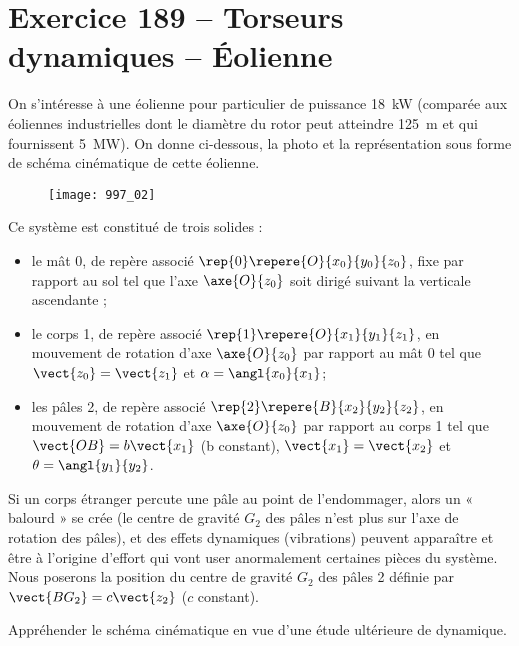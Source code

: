 \section*{Exercice 189 -- Torseurs dynamiques -- Éolienne}
\setcounter{exo}{0}

On s'intéresse à une éolienne pour particulier de puissance \SI{18}{kW} (comparée aux éoliennes
industrielles dont le diamètre du rotor peut atteindre \SI{125}{m} et qui fournissent \SI{5}{MW}).
On donne ci-dessous, la photo et la représentation sous forme de schéma cinématique de cette éolienne.



\begin{figure}[H]
\centering
\texttt{[image: 997\_02]}
\end{figure}

Ce système est constitué de trois solides :
\begin{itemize}
\item le mât 0, de repère associé  $\rep{0}\repere{O}{x_0}{y_0}{z_0}$, fixe par rapport au sol tel que l’axe $\axe{O}{z_0}$  soit dirigé suivant la verticale ascendante ;
\item le corps 1, de repère associé   $\rep{1}\repere{O}{x_1}{y_1}{z_1}$, en mouvement de rotation d’axe $\axe{O}{z_0}$  par rapport au mât 0 tel que $\vect{z_0}=\vect{z_1}$ et $\alpha = \angl{x_0}{x_1}$;
\item les pâles 2, de repère associé $\rep{2}\repere{B}{x_2}{y_2}{z_2}$, en mouvement de rotation d’axe $\axe{O}{z_0}$ par rapport au corps 1 tel que $\vect{OB}=b\vect{x_1}$ (b constant), $\vect{x_1}=\vect{x_2}$ et $\theta = \angl{y_1}{y_2}$.
\end{itemize}
Si un corps étranger percute une pâle au point de l'endommager, alors un « balourd » se crée (le centre de gravité $G_2$ des
pâles n’est plus sur l’axe de rotation des pâles), et des effets dynamiques (vibrations) peuvent apparaître et être à l’origine
d’effort qui vont user anormalement certaines pièces du système.
Nous poserons la position du centre de gravité $G_2$ des pâles 2 définie par $\vect{BG_2}=c\vect{z_2}$ ($c$ constant).

 \begin{obj}
Appréhender le schéma cinématique en vue d’une étude ultérieure de dynamique.
 \end{obj}



